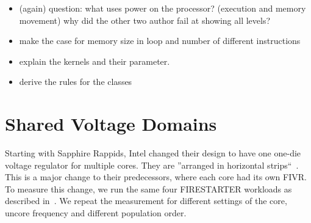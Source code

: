 

\begin{itemize}
    \item (again) question: what uses power on the processor? (execution and memory movement)
    why did the other two author fail at showing all levels?
    \item make the case for memory size in loop and number of different instructions
    \item explain the kernels and their parameter.
    \item derive the rules for the classes
\end{itemize}


\section{Shared Voltage Domains}

Starting with Sapphire Rappids, Intel changed their design to have one one-die voltage regulator for multiple cores.
They are ''arranged in horizontal strips``~\cite{Intel_2022_ISSCC}.
This is a major change to their predecessors, where each core had its own FIVR.
To measure this change, we run the same four FIRESTARTER workloads as described in~.
We repeat the measurement for different settings of the core, uncore frequency and different population order.


